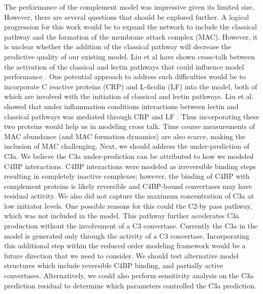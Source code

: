 \documentclass[12pt]{article}
\begin{document}
The performance of the complement model was impressive given its limited size.
However, there are several questions that should be explored further.
A logical progression for this work would be to expand the network to include the classical pathway and the formation of the membrane attack complex (MAC).
However, it is unclear whether the addition of the classical pathway will decrease the predictive quality of our existing model.
Liu et al have shown cross-talk between the activation of the classical and lectin pathways that could influence model performance \cite{liu2011computational}.
One potential approach to address such difficulties would be to incorporate C reactive proteins (CRP) and L-ficolin (LF) into the model,
both of which are involved with the initiation of classical and lectin pathways. Liu et al. showed that under inflammation conditions interactions between lectin and classical pathways was mediated through CRP and LF  \cite{liu2011computational}. Thus incorporating these two proteins would help us in modeling cross talk.
Time course measurements of MAC abundance (and MAC formation dynamics) are also scarce, making the inclusion of MAC challenging.
Next, we should address the under-prediction of C3a. We believe the C3a under-prediction can be attributed to how we modeled C4BP interactions.
C4BP interactions were modeled as irreversible binding steps resulting in completely inactive complexes;
however, the binding of C4BP with complement proteins is likely reversible and C4BP-bound convertases may have residual activity.
We also did not capture the maximum concentration of C3a at low initiator levels.
One possible reasons for this could the C2-by pass pathway, which was not included in the model.
This pathway further accelerates C3a production without the involvement of a C3 convertase.
Currently the C3a in the model is generated only through the activity of a C3 convertase.
Incorporating this additional step within the reduced order modeling framework would be a future direction that we need to consider.
We should test alternative model structures which include reversible C4BP binding, and partially active convertases.
Alternatively, we could also perform sensitivity analysis on the C3a prediction residual to determine which parameters controlled the C3a prediction.

\end{document}
